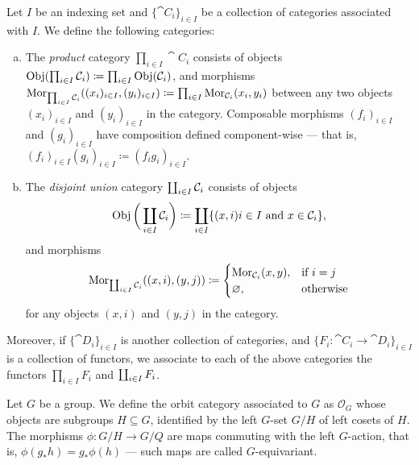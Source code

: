 \begin{definition}
\label{def:product-disjoint-categories}
Let \(I\) be an indexing set and \(\{\cat C_{i}\}_{i \in I}\) be a collection of
categories associated with \(I\). We define the following categories:
\begin{enumerate}[(a)]\setlength\itemsep{0em}
\item The \emph{product} category \(\prod_{i \in I} \cat C_i\) consists of
  objects
  \(\operatorname{Obj}(\prod_{i \in I} \mathcal C_i) \coloneq \prod_{i \in I} \operatorname{Obj}(\mathcal C_i)\),
  and morphisms
  \(\operatorname{Mor}_{\prod_{i \in I} \mathcal C_i}((x_i)_{i \in I}, (y_i)_{i \in I}) \coloneq
  \prod_{i \in I} \operatorname{Mor}_{\mathcal C_i}(x_i, y_i)\) between any two objects
  \((x_i)_{i \in I}\) and \((y_i)_{i \in I}\) in the category. Composable
  morphisms \((f_i)_{i \in I}\) and \((g_i)_{i \in I}\) have composition defined
  component-wise --- that is,
  \((f_i)_{i \in I} (g_i)_{i \in I} \coloneq (f_i g_i)_{i \in I}\).
\item The \emph{disjoint union} category \(\coprod_{i \in I} \mathcal C_i\) consists
  of objects
  \[
    \operatorname{Obj}\bigg(\coprod_{i \in I} \mathcal C_i\bigg) \coloneq
    \coprod_{i \in I} \{(x, i) \relax i \in I \text{ and } x \in \mathcal C_i\},
  \]
  and morphisms
  \[
    \operatorname{Mor}_{\coprod_{i \in I} \mathcal C_i}((x, i), (y, j)) \coloneq
    \begin{cases}
      \operatorname{Mor}_{\mathcal C_i}(x, y), &\text{if } i = j \\
      \varnothing, &\text{otherwise}
    \end{cases}
  \]
  for any objects \((x, i)\) and \((y, j)\) in the category.
\end{enumerate}
Moreover, if \(\{\cat D_{i}\}_{i \in I}\) is another collection of categories,
and \(\{F_{i}: \cat C_i \to \cat D_i\}_{i \in I}\) is a collection of functors,
we associate to each of the above categories the functors \(\prod_{i \in I}
F_i\) and \(\coprod_{i \in I} F_i\).
\end{definition}

\begin{example}
\label{exp:orbit-category}
Let \(G\) be a group. We define the orbit category associated to \(G\) as
\(\mathcal{O}_G\) whose objects are subgroups \(H \subseteq G\), identified by
the left \(G\)-set \(G/H\) of left cosets of \(H\). The morphisms \(\phi: G/H \to
G/Q\) are maps commuting with the left \(G\)-action, that is, \(\phi(g_{*}h) =
g_{*} \phi(h)\) --- such maps are called \(G\)-equivariant.
\end{example}


